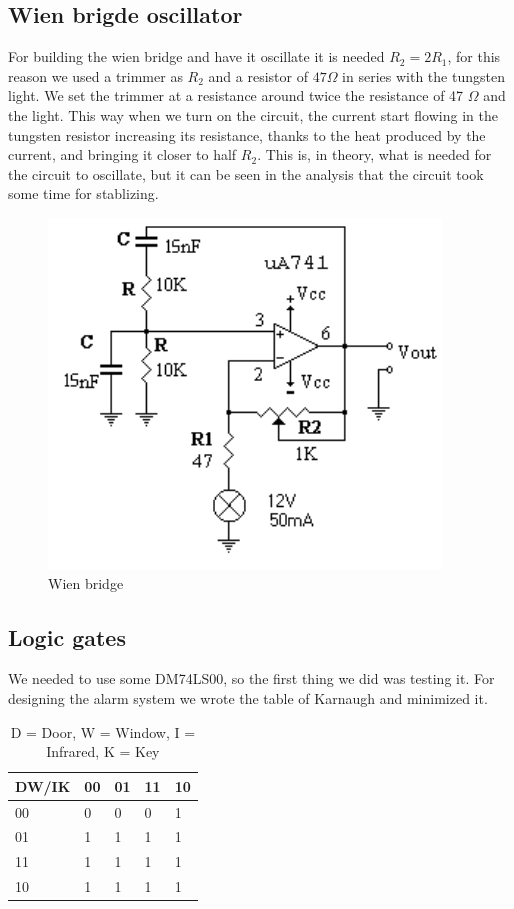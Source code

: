 \subsection{Wien brigde oscillator}
For building the wien bridge and have it oscillate it is needed $R_2 = 2 R_1$, for this reason we used a trimmer as $R_2$ and a resistor of $47 \Omega$ in series with the tungsten light. We set the trimmer at a resistance around twice the resistance of 47 $\Omega$ and the light. This way when we turn on the circuit, the current start flowing in the tungsten resistor increasing its resistance, thanks to the heat produced by the current, and bringing it closer to half $R_2$. This is, in theory, what is needed for the circuit to oscillate, but it can be seen in the analysis that the circuit took some time for stablizing.
\begin{figure}[H]
\centering
\includegraphics[width=.7\textwidth]{9/wien.png}
\caption{Wien bridge}\label{wwien}
\end{figure}
\subsection{Logic gates}
We needed to use some DM74LS00, so the first thing we did was testing it. For designing the alarm system we wrote the table of Karnaugh and minimized it.

\begin{table}[H]
\centering
\label{my-label}
\begin{tabular}{lllll}
\hline
 DW/IK & 00 & 01 & 11 & 10 \\ \hline
 00    & 0  & 0  & 0  & 1 \\
 01    & 1  & 1  & 1  & 1 \\
 11    & 1  & 1  & 1  & 1 \\ 
 10    & 1  & 1  & 1  & 1 \\ \hline
\end{tabular}\caption{D = Door, W = Window, I = Infrared, K = Key}

\end{table}

